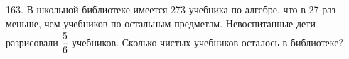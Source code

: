 163. В школьной библиотеке имеется 273 учебника по алгебре, что в 27 раз меньше, чем учебников по остальным предметам. Невоспитанные дети разрисовали $\cfrac{5}{6}$  учебников. Сколько чистых учебников осталось в библиотеке?\\
